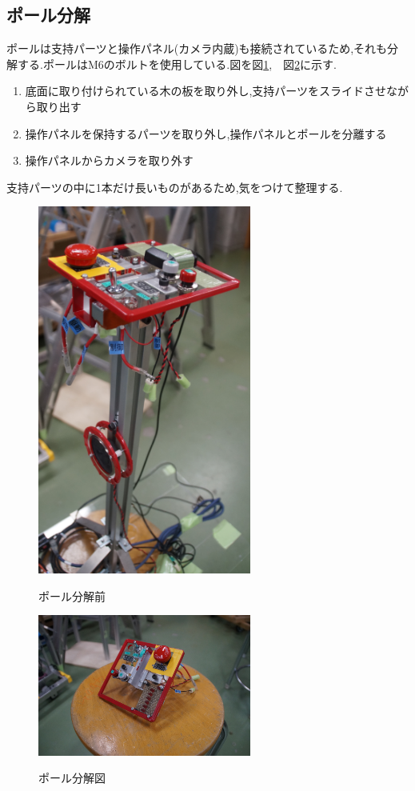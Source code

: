 \subsection{ポール分解}
ポールは支持パーツと操作パネル(カメラ内蔵)も接続されているため,それも分解する.ポールはM6のボルトを使用している.図を図\ref{fig:robot6},　図\ref{fig:robot7}に示す.
\begin{enumerate}
 \item 底面に取り付けられている木の板を取り外し,支持パーツをスライドさせながら取り出す
 \item 操作パネルを保持するパーツを取り外し,操作パネルとポールを分離する 
 \item 操作パネルからカメラを取り外す
\end{enumerate}
支持パーツの中に1本だけ長いものがあるため,気をつけて整理する.
\begin{figure}[htp]
 \begin{center}
  \includegraphics[width=70mm]{img/hard/f6.jpg}
 　\caption{ポール分解前}
  \label{fig:robot6}%
 \end{center}
\end{figure}


\begin{figure}[htp]
 \begin{center}
  \includegraphics[width=70mm]{img/hard/f5.jpg}
 　\caption{ポール分解図}
  \label{fig:robot7}%
 \end{center}
\end{figure}
